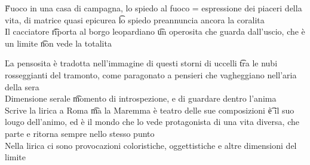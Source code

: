 \documentclass[12pt]{article}
\begin{document}
\v

Fuoco in una casa di campagna, lo spiedo al fuoco = espressione dei piaceri della vita, di matrice quasi epicurea \t lo spiedo preannuncia ancora la coralita \\
Il cacciatore \t riporta al borgo leopardiano \t un operosita che guarda dall'uscio, che è un limite \t non vede la totalita

\v

La pensosita è tradotta nell'immagine di questi storni di uccelli \t tra le nubi rosseggianti del tramonto, come paragonato a pensieri che vagheggiano nell'aria della sera \\
Dimensione serale \t momento di introspezione, e di guardare dentro l'anima \\
Scrive la lirica a Roma \t ma la Maremma è teatro delle sue composizioni \t è il suo lougo dell'animo, ed è il mondo che lo vede protagonista di una vita diversa, che parte e ritorna sempre nello stesso punto \\
Nella lirica ci sono provocazioni coloristiche, oggettistiche e altre dimensioni del limite
\end{document}
